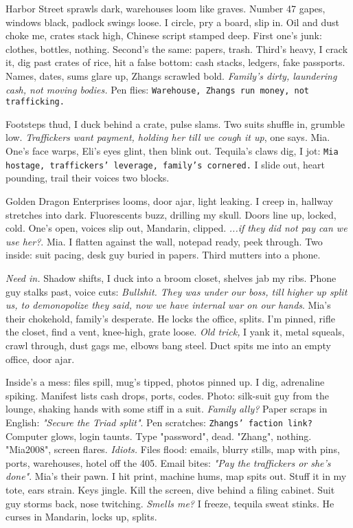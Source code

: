 \documentclass[12pt,oneside]{book}
\newcommand{\note}[1]{\texttt{#1}}
\begin{document}
Harbor Street sprawls dark, warehouses loom like graves. Number 47 gapes, windows black, padlock swings loose. I circle, pry a board, slip in. Oil and dust choke me, crates stack high, Chinese script stamped deep. First one’s junk: clothes, bottles, nothing. Second’s the same: papers, trash. Third’s heavy, I crack it, dig past crates of rice, hit a false bottom: cash stacks, ledgers, fake passports. Names, dates, sums glare up, Zhangs scrawled bold. \textit{Family’s dirty, laundering cash, not moving bodies.} Pen flies: \note{Warehouse, Zhangs run money, not trafficking.}

Footsteps thud, I duck behind a crate, pulse slams. Two suits shuffle in, grumble low. \textit{Traffickers want payment, holding her till we cough it up}, one says. Mia. One’s face warps, \textnormal{Eli}’s eyes glint, then blink out. Tequila’s claws dig, I jot: \note{Mia hostage, traffickers’ leverage, family’s cornered.} I slide out, heart pounding, trail their voices two blocks.

Golden Dragon Enterprises looms, door ajar, light leaking. I creep in, hallway stretches into dark. Fluorescents buzz, drilling my skull. Doors line up, locked, cold. One’s open, voices slip out, Mandarin, clipped. \textit{...if they did not pay can we use her?}. Mia. I flatten against the wall, notepad ready, peek through. Two inside: suit pacing, desk guy buried in papers. Third mutters into a phone.

\textit{Need in.} Shadow shifts, I duck into a broom closet, shelves jab my ribs. Phone guy stalks past, voice cuts: \textit{Bullshit. They was under our boss, till higher up split us, to demonopolize they said, now we have internal war on our hands}. Mia’s their chokehold, family’s desperate. He locks the office, splits. I’m pinned, rifle the closet, find a vent, knee-high, grate loose. \textit{Old trick,} I yank it, metal squeals, crawl through, dust gags me, elbows bang steel. Duct spits me into an empty office, door ajar.

Inside’s a mess: files spill, mug’s tipped, photos pinned up. I dig, adrenaline spiking. Manifest lists cash drops, ports, codes. Photo: silk-suit guy from the lounge, shaking hands with some stiff in a suit. \textit{Family ally?} Paper scraps in English: \textit{"Secure the Triad split"}. Pen scratches: \note{Zhangs’ faction link?} Computer glows, login taunts. Type "password", dead. "Zhang", nothing. "Mia2008", screen flares. \textit{Idiots.} Files flood: emails, blurry stills, map with pins, ports, warehouses, hotel off the 405. Email bites: \textit{"Pay the traffickers or she’s done"}. Mia’s their pawn. I hit print, machine hums, map spits out. Stuff it in my tote, ears strain. Keys jingle. Kill the screen, dive behind a filing cabinet. Suit guy storms back, nose twitching. \textit{Smells me?} I freeze, tequila sweat stinks. He curses in Mandarin, locks up, splits.
\end{document}
